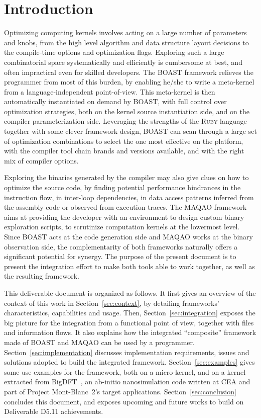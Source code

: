 \documentclass[11pt, a4paper, twoside]{montblanc2}
\def\ruby{\textsc{Ruby}\xspace}
\begin{document}
\section{Introduction}\label{sec:intro}

Optimizing computing kernels involves acting on a large number of parameters and 
knobs, from the high level algorithm and data structure layout decisions to the 
compile-time options and optimization flags. Exploring such a large 
combinatorial space systematically and efficiently is cumbersome at best, and 
often impractical even for skilled developers. The BOAST framework relieves the 
programmer from most of this burden, by enabling he/she to write a meta-kernel 
from a language-independent point-of-view. This meta-kernel is then automatically 
instantiated on demand by BOAST, with full control over optimization strategies, 
both on the kernel source instantiation side, and on the compiler 
parameterization side. Leveraging the strengths of the \ruby language together with 
some clever framework design, BOAST can scan through a large set of optimization 
combinations to select the one most effective on the platform, with the compiler 
tool chain brands and versions available, and with the right mix of compiler 
options.

Exploring the binaries generated by the compiler may also give clues on how to 
optimize the source code, by finding potential performance hindrances in the 
instruction flow, in inter-loop dependencies, in data access patterns inferred 
from the assembly code or observed from execution traces. The MAQAO framework aims 
at providing the developer with an environment to design custom binary 
exploration scripts, to scrutinize computation kernels at the lowermost level. 
Since BOAST acts at the code generation side and MAQAO works at the binary observation 
side, the complementarity of both frameworks naturally offers a significant 
potential for synergy. The purpose of the present document is to present the 
integration effort to make both tools able to work together, as well as the 
resulting framework.

This deliverable document is organized as follows. It first gives an overview of 
the context of this work in Section~\ref{sec:context}, by detailing
frameworks' characteristics, capabilities and usage. Then, 
Section~\ref{sec:integration} exposes the big picture for the integration from a 
functional point of view, together with files and information flows. It also 
explains how the integrated ``composite'' framework made of BOAST and MAQAO can 
be used by a programmer. Section~\ref{sec:implementation} discusses 
implementation requirements, issues and solutions adopted to build the 
integrated framework. Section~\ref{sec:examples} gives some use examples for the 
framework, both on a micro-kernel, and on a kernel extracted from
BigDFT~\cite{genovese:bigdft:jcp:2008}, an ab-initio nanosimulation code
written at CEA and part of Project Mont-Blanc~2's target applications.
Section~\ref{sec:conclusion} concludes this document, and exposes upcoming and
future works to build on Deliverable D5.11 achievements.
\end{document}
